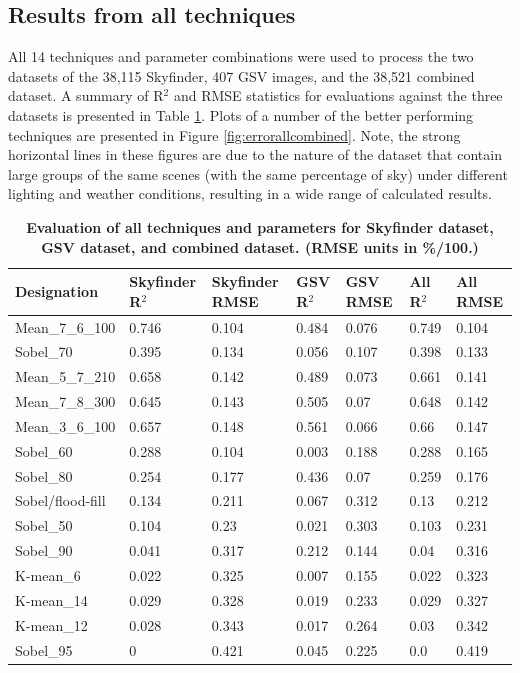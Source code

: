 \documentclass[final,3p,times,authoryear]{elsarticle}
\begin{document}
\subsection{Results from all techniques}\label{sec:resultsall}
All 14 techniques and parameter combinations were used to process the two datasets of the 38,115 Skyfinder, 407 GSV images, and the 38,521 combined dataset. A summary of R$^{2}$ and RMSE statistics for evaluations against the three datasets is presented in Table \ref{tab:evalall}. Plots of a number of the better performing techniques are presented in Figure \ref{fig:errorallcombined}. Note, the strong horizontal lines in these figures are due to the nature of the dataset that contain large groups of the same scenes (with the same percentage of sky) under different lighting and weather conditions, resulting in a wide range of calculated results.

\begin{table}[!htbp]
\caption{\bf Evaluation of all techniques and parameters for Skyfinder dataset, GSV dataset, and combined dataset. (RMSE units in \%/100.) \label{tab:evalall}}     
\begin{tabular}{ l  l l l l l l}
\textbf{Designation}  & \textbf{Skyfinder R$^{2}$} & \textbf{Skyfinder RMSE} & \textbf{GSV R$^{2}$} & \textbf{GSV RMSE} & \textbf{All R$^{2}$} & \textbf{All RMSE} \\ \hline
Mean\_7\_6\_100	&0.746&0.104&0.484&0.076&0.749&0.104 \\
Sobel\_70 &0.395&0.134&0.056&0.107&0.398&0.133 \\
Mean\_5\_7\_210	&0.658&0.142&0.489&0.073&0.661&0.141 \\
Mean\_7\_8\_300 &0.645&0.143&0.505&0.07&0.648&0.142 \\
Mean\_3\_6\_100	&0.657&0.148&0.561&0.066&0.66&0.147 \\
Sobel\_60 &0.288&0.104&0.003&0.188&0.288&0.165 \\
Sobel\_80 &0.254&0.177&0.436&0.07&0.259&0.176 \\
Sobel/flood-fill &0.134&0.211&0.067&0.312&0.13&0.212 \\
Sobel\_50 &0.104&0.23&0.021&0.303&0.103&0.231 \\
Sobel\_90 &0.041&0.317&0.212&0.144&0.04&0.316 \\
K-mean\_6 &0.022&0.325&0.007&0.155&0.022&0.323 \\
K-mean\_14 &0.029&0.328&0.019&0.233&0.029&0.327 \\
K-mean\_12 &0.028&0.343&0.017&0.264&0.03&0.342 \\
Sobel\_95 &0&0.421&0.045&0.225&0.0&0.419 \\
\hline
\end{tabular}
\end{table}
\end{document}
